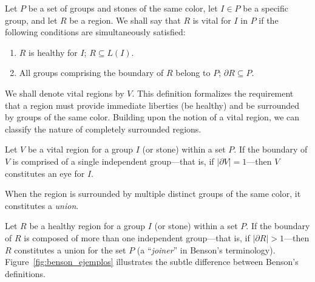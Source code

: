\begin{definition}\label{def:reg_vital}
	Let $P$ be a set of groups and stones of the same color, let $I \in P$ be a specific group, and let $R$ be a region. We shall say that $R$ is vital for $I$ in $P$ if the following conditions are simultaneously satisfied:
	\begin{enumerate}
		\item $R$ is healthy for $I$; $R\subseteq L(I)$.
		\item All groups comprising the boundary of $R$ belong to $P$; $\partial R \subseteq P$.
	\end{enumerate}
\end{definition}
We shall denote vital regions by \(V\). This definition formalizes the requirement that a region must provide immediate liberties (be healthy) and be surrounded by groups of the same color. Building upon the notion of a vital region, we can classify the nature of completely surrounded regions.
\begin{definition}[Eye]
	Let \(V\) be a vital region for a group \(I\) (or stone) within a set \(P\). If the boundary of \(V\) is comprised of a single independent group—that is, if \(|\partial V| = 1\)—then \(V\) constitutes an eye for \(I\).
\end{definition}

When the region is surrounded by multiple distinct groups of the same color, it constitutes a \textit{union}.

\begin{definition}[Union]
	Let \(R\) be a healthy region for a group \(I\) (or stone) within a set \(P\). If the boundary of \(R\) is composed of more than one independent group—that is, if \(|\partial R| > 1\)—then \(R\) constitutes a union for the set \(P\) (a ``\textit{joiner}'' in Benson's terminology). Figure~\ref{fig:benson_ejemplos} illustrates the subtle difference between Benson's definitions.
\end{definition}

